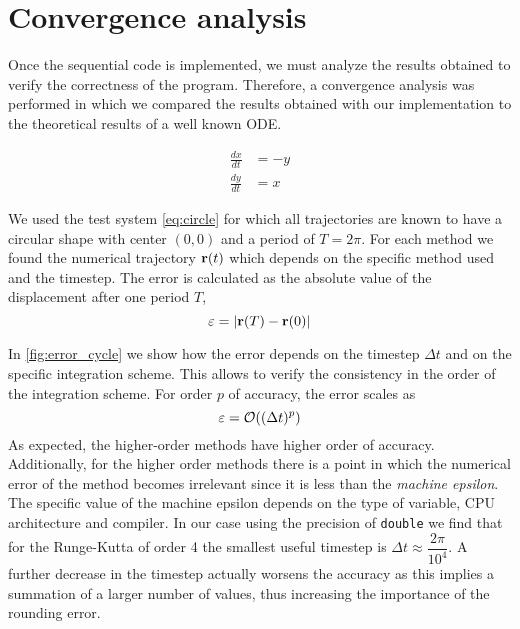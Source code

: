 
\section{Convergence analysis}%
\label{sec:convergence}

Once the sequential code is implemented, we must analyze the results obtained to
verify the correctness of the program. Therefore, a convergence analysis was
performed in which we compared the results obtained with our implementation to
the theoretical results of a well known ODE.

\begin{align}\label{eq:circle}
    \frac{dx}{dt} &= -y \nonumber \\
    \frac{dy}{dt} &= x
\end{align}

We used the test system \cref{eq:circle} for which all trajectories are known to have a circular shape with center $(0,0)$ and a period of $T=2\pi$. For each method we found the numerical trajectory
${\bf r}(t)$ which depends on the specific method used and the timestep.
The error is calculated as the absolute value of the displacement after one period $T$,
\begin{equation}
\varepsilon = |{\bf r}(T)-{\bf r}(0)|
\label{Eq:epsilon:T}
\end{equation}

In \cref{fig:error_cycle} we show how the error depends on the timestep $\Delta t$ and on the specific integration scheme.
This allows to verify the consistency in the order of the integration scheme. For order $p$ of accuracy, the error scales as
\begin{equation}
\varepsilon = {\cal O}((\Delta t)^p)
\end{equation}
As expected, the higher-order methods have higher order of accuracy.
Additionally, for the higher order methods there is a point in which the numerical error of the method becomes irrelevant since it is less than the {\em machine epsilon}.
The specific value of the machine epsilon depends on the type of variable, CPU architecture and compiler.
In our case using the precision of \texttt{double} we find that for the Runge-Kutta of order 4 the smallest useful timestep is $\Delta t \approx \dfrac{2\pi}{10^4}$.
A further decrease in the timestep actually worsens the accuracy as this implies a summation of a larger number of values, thus increasing the importance of the rounding error.

